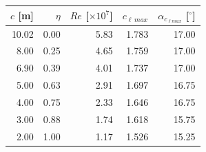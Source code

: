 \begin{tabular}{rrrrr}
\toprule
$c$ [m] & $\eta$ & $Re$ [$\times 10^{7}$] & $c_{\ell\,max}$ & $\alpha_{c_{\ell max}}$ [$^\circ$] \\
\midrule
10.02 & 0.00 & 5.83 & 1.783 & 17.00 \\
8.00 & 0.25 & 4.65 & 1.759 & 17.00 \\
6.90 & 0.39 & 4.01 & 1.737 & 17.00 \\
5.00 & 0.63 & 2.91 & 1.697 & 16.75 \\
4.00 & 0.75 & 2.33 & 1.646 & 16.75 \\
3.00 & 0.88 & 1.74 & 1.618 & 15.75 \\
2.00 & 1.00 & 1.17 & 1.526 & 15.25 \\
\bottomrule
\end{tabular}
